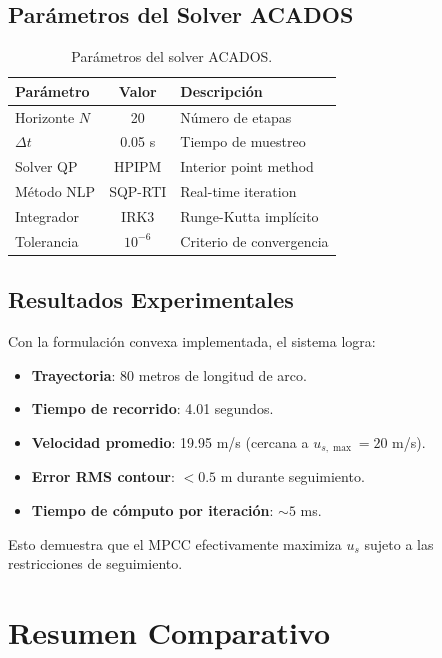 \documentclass[11pt,a4paper]{article}
\begin{document}
\subsection{Parámetros del Solver ACADOS}

\begin{table}[h]
\centering
\begin{tabular}{|l|c|l|}
\hline
\textbf{Parámetro} & \textbf{Valor} & \textbf{Descripción} \\
\hline
Horizonte $N$ & 20 & Número de etapas \\
$\Delta t$ & 0.05 s & Tiempo de muestreo \\
Solver QP & HPIPM & Interior point method \\
Método NLP & SQP-RTI & Real-time iteration \\
Integrador & IRK3 & Runge-Kutta implícito \\
Tolerancia & $10^{-6}$ & Criterio de convergencia \\
\hline
\end{tabular}
\caption{Parámetros del solver ACADOS.}
\end{table}

\subsection{Resultados Experimentales}

Con la formulación convexa implementada, el sistema logra:

\begin{itemize}
    \item \textbf{Trayectoria}: 80 metros de longitud de arco.
    \item \textbf{Tiempo de recorrido}: 4.01 segundos.
    \item \textbf{Velocidad promedio}: 19.95 m/s (cercana a $u_{s,\max} = 20$ m/s).
    \item \textbf{Error RMS contour}: $< 0.5$ m durante seguimiento.
    \item \textbf{Tiempo de cómputo por iteración}: $\sim 5$ ms.
\end{itemize}

Esto demuestra que el MPCC efectivamente maximiza $u_s$ sujeto a las restricciones de seguimiento.

\section{Resumen Comparativo}
\label{sec:summary}
\end{document}
